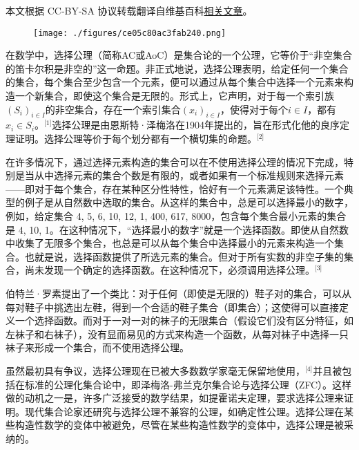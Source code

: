 
本文根据 CC-BY-SA 协议转载翻译自维基百科\href{https://en.wikipedia.org/wiki/Axiom_of_choice}{相关文章}。

\begin{figure}[ht]
\centering
\texttt{[image: ./figures/ce05c80ac3fab240.png]}
\caption{} \label{fig_AC_1}
\end{figure}
在数学中，选择公理（简称AC或AoC）是集合论的一个公理，它等价于“非空集合的笛卡尔积是非空的”这一命题。非正式地说，选择公理表明，给定任何一个集合的集合，每个集合至少包含一个元素，便可以通过从每个集合中选择一个元素来构造一个新集合，即使这个集合是无限的。形式上，它声明，对于每一个索引族\( (S_i)_{i \in I} \)的非空集合，存在一个索引集合\( (x_i)_{i \in I} \)，使得对于每个\( i \in I \)，都有\( x_i \in S_i\)。\(^\text{[1]}\)选择公理是由恩斯特·泽梅洛在1904年提出的，旨在形式化他的良序定理证明。选择公理等价于每个划分都有一个横切集的命题。\(^\text{[2]}\)

在许多情况下，通过选择元素构造的集合可以在不使用选择公理的情况下完成，特别是当从中选择元素的集合个数是有限的，或者如果有一个标准规则来选择元素——即对于每个集合，存在某种区分性特性，恰好有一个元素满足该特性。一个典型的例子是从自然数中选取的集合。从这样的集合中，总是可以选择最小的数字，例如，给定集合 {{4, 5, 6}, {10, 12}, {1, 400, 617, 8000}}，包含每个集合最小元素的集合是 {4, 10, 1}。在这种情况下，“选择最小的数字”就是一个选择函数。即使从自然数中收集了无限多个集合，也总是可以从每个集合中选择最小的元素来构造一个集合。也就是说，选择函数提供了所选元素的集合。但对于所有实数的非空子集的集合，尚未发现一个确定的选择函数。在这种情况下，必须调用选择公理。\(^\text{[3]}\)

伯特兰·罗素提出了一个类比：对于任何（即使是无限的）鞋子对的集合，可以从每对鞋子中挑选出左鞋，得到一个合适的鞋子集合（即集合）；这使得可以直接定义一个选择函数。而对于一对一对的袜子的无限集合（假设它们没有区分特征，如左袜子和右袜子），没有显而易见的方式来构造一个函数，从每对袜子中选择一只袜子来形成一个集合，而不使用选择公理。

虽然最初具有争议，选择公理现在已被大多数数学家毫无保留地使用，\(^\text{[4]}\)并且被包括在标准的公理化集合论中，即泽梅洛-弗兰克尔集合论与选择公理（ZFC）。这样做的动机之一是，许多广泛接受的数学结果，如提霍诺夫定理，要求选择公理来证明。现代集合论家还研究与选择公理不兼容的公理，如确定性公理。选择公理在某些构造性数学的变体中被避免，尽管在某些构造性数学的变体中，选择公理是被采纳的。